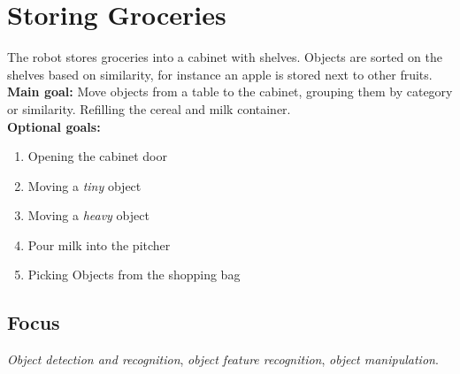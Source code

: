 \section{Storing Groceries}
\label{test:storing-groceries}
The robot stores groceries into a cabinet with shelves. Objects are sorted on the shelves based on similarity, for instance an apple is stored next to other fruits.\\

\noindent \textbf{Main goal:} Move objects from a table to the cabinet, grouping them by category or similarity. Refilling the cereal and milk container.\\

\noindent \textbf{Optional goals:}
\begin{enumerate}[nosep]
	\item Opening the cabinet door
	\item Moving a \emph{tiny} object
	\item Moving a \emph{heavy} object
	\item Pour milk into the pitcher
	\item Picking Objects from the shopping bag
\end{enumerate}

\subsection*{Focus}
\emph{Object detection and recognition}, \emph{object feature recognition}, \emph{object manipulation}.

